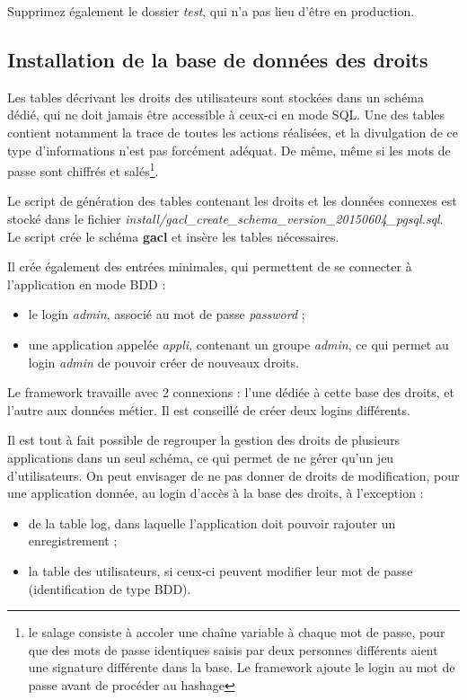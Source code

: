 Supprimez également le dossier \textit{test}, qui n'a pas lieu d'être en production.

\subsection{Installation de la base de données des droits}

Les tables décrivant les droits des utilisateurs sont stockées dans un schéma dédié, qui ne doit jamais être accessible à ceux-ci en mode SQL. Une des tables contient notamment la trace de toutes les actions réalisées, et la divulgation de ce type d'informations n'est pas forcément adéquat. De même, même si les mots de passe sont chiffrés et salés\footnote{le salage consiste à accoler une chaîne variable à chaque mot de passe, pour que des mots de passe identiques saisis par deux personnes différents aient une signature différente dans la base. Le framework ajoute le login au mot de passe avant de procéder au hashage}.

Le script de génération des tables contenant les droits et les données connexes est stocké dans le fichier \textit{install/gacl\_create\_schema\_version\_20150604\_pgsql.sql}. Le script crée le schéma \textbf{gacl} et insère les tables nécessaires.

Il crée également des entrées minimales, qui permettent de se connecter à l'application en mode BDD : 
\begin{itemize}
\item le login \textit{admin}, associé au mot de passe \textit{password} ;
\item une application appelée \textit{appli}, contenant un groupe \textit{admin}, ce qui permet au login \textit{admin} de pouvoir créer de nouveaux droits.
\end{itemize}

Le framework travaille avec 2 connexions : l'une dédiée à cette base des droits, et l'autre aux données métier. Il est conseillé de créer deux logins différents.

Il est tout à fait possible de regrouper la gestion des droits de plusieurs applications dans un seul schéma, ce qui permet de ne gérer qu'un jeu d'utilisateurs. On peut envisager de ne pas donner de droits de modification, pour une application donnée, au login d'accès à la base des droits, à l'exception :
\begin{itemize}
\item de la table log, dans laquelle l'application doit pouvoir rajouter un enregistrement ;
\item la table des utilisateurs, si ceux-ci peuvent modifier leur mot de passe (identification de type BDD).
\end{itemize}

